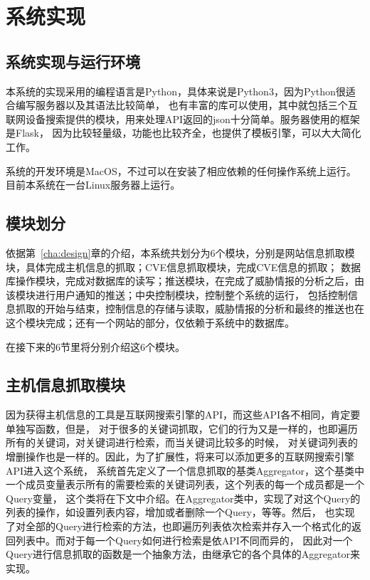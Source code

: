 \chapter{系统实现}
\label{cha:implementation}

\section{系统实现与运行环境}
\label{sec:env}

本系统的实现采用的编程语言是Python，具体来说是Python3，因为Python很适合编写服务器以及其语法比较简单，
也有丰富的库可以使用，其中就包括三个互联网设备搜索提供的模块，用来处理API返回的json十分简单。服务器使用的框架是Flask，
因为比较轻量级，功能也比较齐全，也提供了模板引擎，可以大大简化工作。

系统的开发环境是MacOS，不过可以在安装了相应依赖的任何操作系统上运行。目前本系统在一台Linux服务器上运行。

\section{模块划分}
\label{sec:modules}

依据第~\ref{cha:design}章的介绍，本系统共划分为6个模块，分别是网站信息抓取模块，具体完成主机信息的抓取；CVE信息抓取模块，完成CVE信息的抓取；
数据库操作模块，完成对数据库的读写；推送模块，在完成了威胁情报的分析之后，由该模块进行用户通知的推送；中央控制模块，控制整个系统的运行，
包括控制信息抓取的开始与结束，控制信息的存储与读取，威胁情报的分析和最终的推送也在这个模块完成；还有一个网站的部分，仅依赖于系统中的数据库。

在接下来的6节里将分别介绍这6个模块。

\section{主机信息抓取模块}
\label{sec:hosts-module}

因为获得主机信息的工具是互联网搜索引擎的API，而这些API各不相同，肯定要单独写函数，但是，
对于很多的关键词抓取，它们的行为又是一样的，也即遍历所有的关键词，对关键词进行检索，而当关键词比较多的时候，
对关键词列表的增删操作也是一样的。因此，为了扩展性，将来可以添加更多的互联网搜索引擎API进入这个系统，
系统首先定义了一个信息抓取的基类Aggregator，这个基类中一个成员变量表示所有的需要检索的关键词列表，这个列表的每一个成员都是一个Query变量，
这个类将在下文中介绍。在Aggregator类中，实现了对这个Query的列表的操作，如设置列表内容，增加或者删除一个Query，等等。然后，
也实现了对全部的Query进行检索的方法，也即遍历列表依次检索并存入一个格式化的返回列表中。而对于每一个Query如何进行检索是依API不同而异的，
因此对一个Query进行信息抓取的函数是一个抽象方法，由继承它的各个具体的Aggregator来实现。

